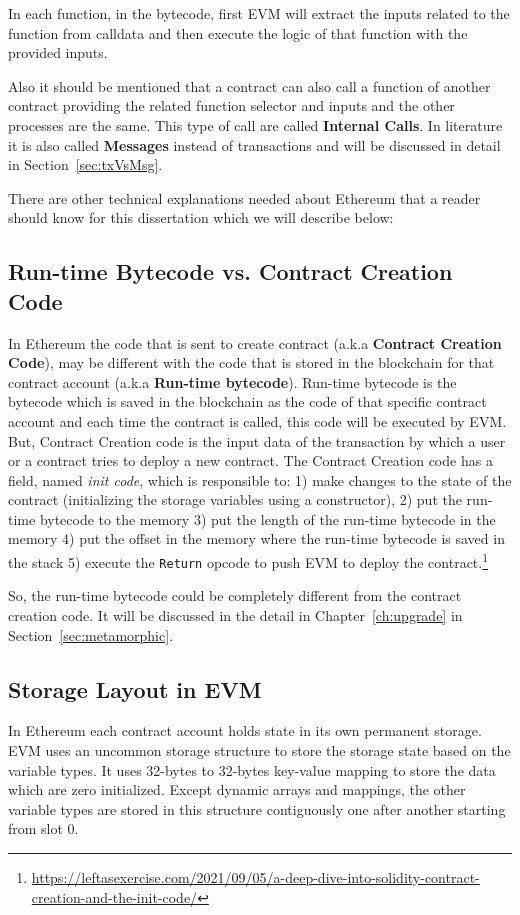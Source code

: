 In each function, in the bytecode, first EVM will extract the inputs related to the function from calldata and then execute the logic of that function with the provided inputs.

Also it should be mentioned that a contract can also call a function of another contract providing the related function selector and inputs and the other processes are the same. This type of call are called \textbf{Internal Calls}. In literature it is also called \textbf{Messages} instead of transactions and will be discussed in detail in Section~\ref{sec:txVsMsg}.

There are other technical explanations needed about Ethereum that a reader should know for this dissertation which we will describe below:

\subsection{Run-time Bytecode vs. Contract Creation Code}
In Ethereum the code that is sent to create contract (a.k.a \textbf{Contract Creation Code}), may be different with the code that is stored in the blockchain for that contract account (a.k.a \textbf{Run-time bytecode}). Run-time bytecode is the bytecode which is saved in the blockchain as the code of that specific contract account and each time the contract is called, this code will be executed by EVM. But, Contract Creation code is the input data of the transaction by which a user or a contract tries to deploy a new contract. The Contract Creation code has a field, named \textit{init code}, which is responsible to: 1) make changes to the state of the contract (initializing the storage variables using a constructor), 2) put the run-time bytecode to the memory 3) put the length of the run-time bytecode in the memory 4) put the offset in the memory where the run-time bytecode is saved in the stack 5) execute the \texttt{Return} opcode to push EVM to deploy the contract.\footnote{\url{https://leftasexercise.com/2021/09/05/a-deep-dive-into-solidity-contract-creation-and-the-init-code/}} 

So, the run-time bytecode could be completely different from the contract creation code. It will be discussed in the detail in Chapter~\ref{ch:upgrade} in Section~\ref{sec:metamorphic}.

\subsection{Storage Layout in EVM} \label{sec:storagelayout}
In Ethereum each contract account holds state in its own permanent storage. EVM uses an uncommon storage structure to store the storage state based on the variable types. It uses 32-bytes to 32-bytes key-value mapping to store the data which are zero initialized. Except dynamic arrays and mappings, the other variable types are stored in this structure contiguously one after another starting from slot 0. 

